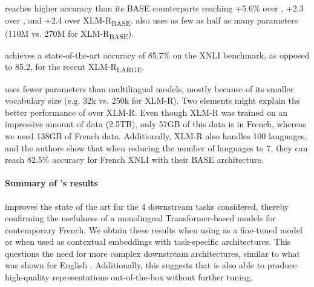 \camembert reaches higher accuracy than its BASE counterparts reaching +5.6\% over \mbert, +2.3 over \xlmmlmtlm, and +2.4 over XLM-R\textsubscript{BASE}. \camembert also uses as few as half as many parameters (110M vs. 270M for XLM-R\textsubscript{BASE}).

\camembertccnetlarge achieves a state-of-the-art accuracy of 85.7\% on the XNLI benchmark, as opposed to 85.2, for the recent XLM-R\textsubscript{LARGE}.

\camembert uses fewer parameters than multilingual models, mostly because of its smaller vocabulary size (e.g. 32k vs. 250k for XLM-R). Two elements might explain the better performance of \camembert over XLM-R. Even though XLM-R was trained on an impressive amount of data (2.5TB), only 57GB of this data is in French, whereas we used 138GB of French data. Additionally, XLM-R also handles 100 languages, and the authors show that when reducing the number of languages to 7, they can reach 82.5\% accuracy for French XNLI with their BASE architecture.

\paragraph{Summary of \camembert's results}
\camembert improves the state of the art for the 4 downstream tasks considered, thereby confirming the usefulness of a monolingual Transformer-based models for contemporary French. We obtain these results when using \camembert as a fine-tuned model or when used as contextual embeddings with task-specific architectures. This questions the need for more complex downstream architectures, similar to what was shown for English \citep{devlin-etal-2019-bert}. Additionally, this suggests that \camembert is also able to produce high-quality representations out-of-the-box without further tuning.

